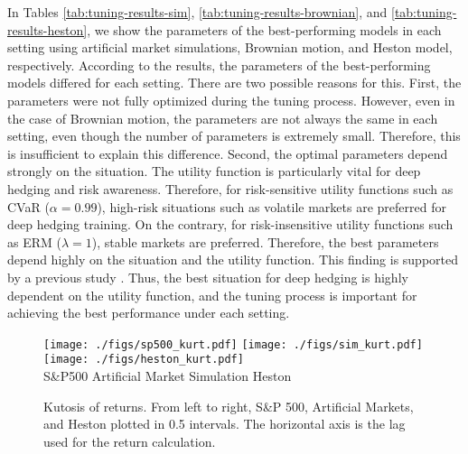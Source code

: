 In Tables \ref{tab:tuning-results-sim}, \ref{tab:tuning-results-brownian}, and \ref{tab:tuning-results-heston}, we show the parameters of the best-performing models in each setting using artificial market simulations, Brownian motion, and Heston model, respectively.
According to the results, the parameters of the best-performing models differed for each setting.
There are two possible reasons for this.
First, the parameters were not fully optimized during the tuning process.
However, even in the case of Brownian motion, the parameters are not always the same in each setting, even though the number of parameters is extremely small.
Therefore, this is insufficient to explain this difference.
Second, the optimal parameters depend strongly on the situation.
The utility function is particularly vital for deep hedging and risk awareness.
Therefore, for risk-sensitive utility functions such as CVaR ($\alpha=0.99$), high-risk situations such as volatile markets are preferred for deep hedging training.
On the contrary, for risk-insensitive utility functions such as ERM ($\lambda=1$), stable markets are preferred.
Therefore, the best parameters depend highly on the situation and the utility function.
This finding is supported by a previous study \cite{Hirano2023-icaif}.
Thus, the best situation for deep hedging is highly dependent on the utility function, and the tuning process is important for achieving the best performance under each setting.

\begin{figure*}[htb]
    \centering
    \texttt{[image: ./figs/sp500\_kurt.pdf]}
    \texttt{[image: ./figs/sim\_kurt.pdf]}
    \texttt{[image: ./figs/heston\_kurt.pdf]}\\
    S\&P500 \hspace{0.17\linewidth} Artificial Market Simulation \hspace{0.17\linewidth} Heston
    \caption{Kutosis of returns. From left to right, S\&P 500, Artificial Markets, and Heston plotted in 0.5 intervals. The horizontal axis is the lag used for the return calculation.}
    \label{fig:kurt}
\end{figure*}


